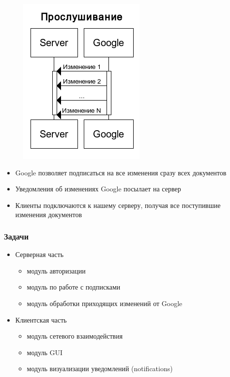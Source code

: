\documentclass[10pt,pdf,hyperref={unicode}]{beamer}
\begin{document}
\begin{frame}
\begin{figure}[ht]
\begin{minipage}[b]{0.5\linewidth}
            \end{minipage}%
            \begin{minipage}[b]{0.5\linewidth}
                \centering
                \includegraphics[scale=0.25]{listening.png} 
            \end{minipage} 
        \end{figure}
        \begin{itemize}%
            \item	Google позволяет подписаться на все изменения сразу всех документов
            \pause
            \item   Уведомления об изменениях Google посылает на сервер
            \pause
            \item   Клиенты подключаются к нашему серверу, получая все поступившие изменения документов
        \end{itemize}
    \end{frame}

    \begin{frame}\frametitle{Задачи}
        \begin{itemize}%
        	\item Серверная часть
	        \begin{itemize}
                \item модуль авторизации
                \item модуль по работе с подписками
                \item модуль обработки приходящих изменений от Google
            \end{itemize}            
            \pause
        	\item Клиентская часть
	        \begin{itemize}
                \item модуль сетевого взаимодействия
                \item модуль GUI
                \item модуль визуализации уведомлений (notifications)
            \end{itemize}                        
        \end{itemize}
    \end{frame}
    
\end{document}
